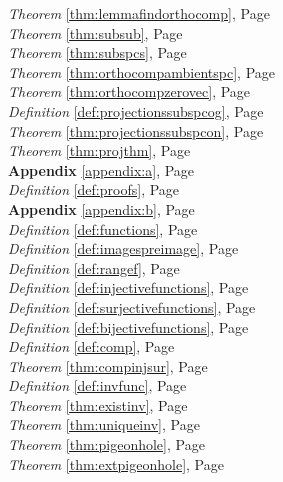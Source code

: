 \begin{multicols}{3}
\begin{center}
      \textit{Theorem} \ref{thm:lemmafindorthocomp}, Page \pageref{thm:lemmafindorthocomp} \\
      \textit{Theorem} \ref{thm:subsub}, Page \pageref{thm:subsub} \\
      \textit{Theorem} \ref{thm:subspcs}, Page \pageref{thm:subspcs} \\
      \textit{Theorem} \ref{thm:orthocompambientspc}, Page \pageref{thm:orthocompambientspc} \\
      \textit{Theorem} \ref{thm:orthocompzerovec}, Page \pageref{thm:orthocompzerovec} \\
      \textit{Definition} \ref{def:projectionssubspcog}, Page \pageref{def:projectionssubspcog} \\
      \textit{Theorem} \ref{thm:projectionssubspcon}, Page \pageref{thm:projectionssubspcon} \\
      \textit{Theorem} \ref{thm:projthm}, Page \pageref{thm:projthm} \\
      \textbf{Appendix} \ref{appendix:a}, Page \pageref{appendix:a} \\
      \textit{Definition} \ref{def:proofs}, Page \pageref{def:proofs} \\
      \textbf{Appendix} \ref{appendix:b}, Page \pageref{appendix:b} \\
      \textit{Definition} \ref{def:functions}, Page \pageref{def:functions} \\
      \textit{Definition} \ref{def:imagespreimage}, Page \pageref{def:imagespreimage} \\
      \textit{Definition} \ref{def:rangef}, Page \pageref{def:rangef} \\
      \textit{Definition} \ref{def:injectivefunctions}, Page \pageref{def:injectivefunctions} \\
      \textit{Definition} \ref{def:surjectivefunctions}, Page \pageref{def:surjectivefunctions} \\
      \textit{Definition} \ref{def:bijectivefunctions}, Page \pageref{def:bijectivefunctions} \\
      \textit{Definition} \ref{def:comp}, Page \pageref{def:comp} \\
      \textit{Theorem} \ref{thm:compinjsur}, Page \pageref{thm:compinjsur} \\
      \textit{Definition} \ref{def:invfunc}, Page \pageref{def:invfunc} \\
      \textit{Theorem} \ref{thm:existinv}, Page \pageref{thm:existinv} \\
      \textit{Theorem} \ref{thm:uniqueinv}, Page \pageref{thm:uniqueinv} \\
      \textit{Theorem} \ref{thm:pigeonhole}, Page \pageref{thm:pigeonhole} \\
      \textit{Theorem} \ref{thm:extpigeonhole}, Page \pageref{thm:extpigeonhole} \\
   \end{center}
\end{multicols}